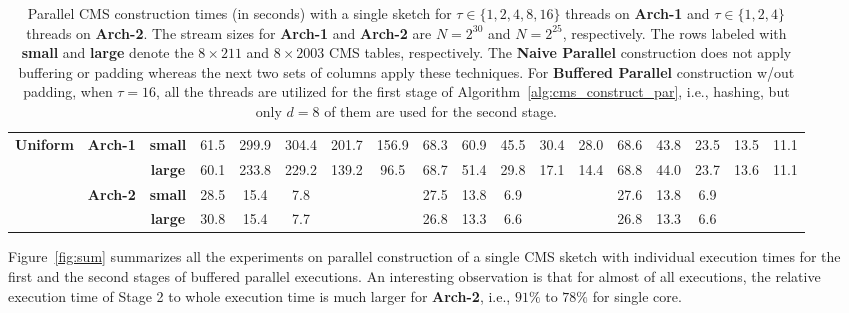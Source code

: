\documentclass[10pt, conference, compsocconf]{IEEEtran}
\begin{document}
\begin{table}[]
{\begin{tabular}{ccc||ccccc|ccccc|ccccc}
\multicolumn{1}{c}{\multirow{4}{*}{\textbf{Uniform}}} 
&\multirow{2}{*}{\textbf{Arch-1}} & \textbf{small}  & 61.5  & 299.9  & 304.4  & 201.7  & 156.9 & 68.3  & 60.9  & 45.5  & 30.4  & 28.0  & 68.6  & 43.8  & 23.5    & 13.5  & 11.1 \\
&& \textbf{large} & 60.1  & 233.8  & 229.2  & 139.2  & 96.5  & 68.7  & 51.4  & 29.8  & 17.1& 14.4&68.8&44.0&23.7&13.6& 11.1 \\ \cline{2-18}
&\multirow{2}{*}{\textbf{Arch-2}}  & \textbf{small}  & 28.5  & 15.4   & 7.8   &        &       & 27.5  & 13.8  & 6.9  &       &       & 27.6  & 13.8  & 6.9  &       &      \\
&& \textbf{large} & 30.8 & 15.4   & 7.7   &        &       & 26.8  & 13.3  & 6.6  &       &       & 26.8  & 13.3  & 6.6  &       &  \\ 
\end{tabular}
}
\caption{Parallel CMS construction times (in seconds) with a single sketch for $\tau \in \{1, 2, 4, 8, 16\}$ threads on \textbf{Arch-1} and  $\tau \in \{1, 2, 4\}$ threads on \textbf{Arch-2}. The stream sizes for \textbf{Arch-1} and \textbf{Arch-2} are $N = 2^{30}$ and $N = 2^{25}$, respectively. The rows labeled with {\bf small} and {\bf large} denote the $8 \times 211$ and $8 \times 2003$ CMS tables, respectively. The {\bf Naive Parallel} construction does not apply buffering or padding whereas the next two sets of columns apply these techniques. For {\bf Buffered Parallel} construction w/out padding, when $\tau = 16$, all the threads are utilized for the first stage of Algorithm~\ref{alg:cms_construct_par}, i.e., hashing, but only $d = 8$ of them are used for the second stage.}\label{tbl:batch}
\end{table}

Figure~\ref{fig:sum} summarizes all the experiments on parallel construction of a single CMS sketch with individual execution times for the first and the second stages of buffered parallel executions. An interesting observation is that for almost of all executions, the relative execution time of Stage 2 to whole execution time is much larger for \textbf{Arch-2}, i.e., $91\%$ to $78\%$ for single core. 
\end{document}

